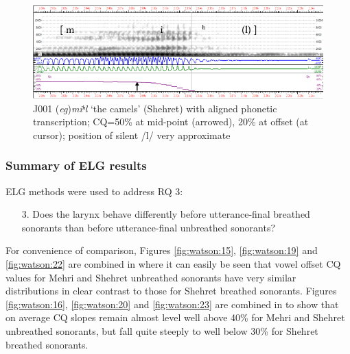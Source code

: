 \documentclass[output=paper]{langscibook}
\begin{document}
\begin{figure}[t]
\includegraphics[width=\textwidth]{figures/a12Watsonetal-img028.pdf}
\caption{J001 (\textit{eg})\textit{miʰl} ‘the camels’ (Shehret) with aligned phonetic transcription; CQ=50\% at mid-point (arrowed), 20\% at offset (at cursor); position of silent \mbox{/l/} very approximate}
\label{fig:watson:24}
\end{figure}

\subsubsection{Summary of ELG results} %
\label{sec:watson:4.4.5}
ELG methods were used to address RQ 3:

\begin{enumerate}
  \item[3.] Does the larynx behave differently before utterance-final breathed sonorants than before utterance-final unbreathed sonorants?
\end{enumerate}

For convenience of comparison, Figures \ref{fig:watson:15}, \ref{fig:watson:19} and \ref{fig:watson:22} are combined in  where it can easily be seen that vowel offset CQ values for Mehri and Shehret unbreathed sonorants have very similar distributions in clear contrast to those for Shehret breathed sonorants. Figures \ref{fig:watson:16}, \ref{fig:watson:20} and \ref{fig:watson:23} are combined in  to show that on average CQ slopes remain almost level well above 40\% for Mehri and Shehret unbreathed sonorants, but fall quite steeply to well below 30\% for Shehret breathed sonorants.
\end{document}
